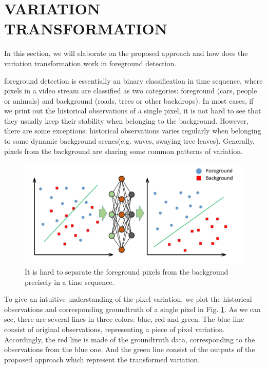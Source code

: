 \documentclass[journal]{IEEEtran}
\newcommand{\reffig}[1]{Fig. \ref{#1}}
\begin{document}
\section{VARIATION TRANSFORMATION}
\label{sec3}
In this section, we will elaborate on the proposed approach and how does the variation transformation work in foreground detection.

foreground detection is essentially an binary classification in time sequence, where pixels in a video stream are classified as two categories: foreground (cars, people or animals) and background (roads, trees or other backdrops). 
In most cases, if we print out the historical observations of a single pixel, it is not hard to see that they usually keep their stability when belonging to the background. 
However, there are some exceptions: historical observations varies regularly when belonging to some dynamic background scenes(e.g. 
waves, swaying tree leaves). 
Generally, pixels from the background are sharing some common patterns of variation. 
\begin{figure}[!t]	%
\centering
    \includegraphics[width=\linewidth]{figure/fig1}
    \caption{It is hard to separate the foreground pixels from the background precisely in a time sequence.}
    \label{variation_chart}
\end{figure}


To give an intuitive understanding of the pixel variation, we plot the historical observations and corresponding groundtruth of a single pixel in  \reffig{variation_chart}.
As we can see, there are several lines in three colors: blue, red and green. 
The blue line consist of original observations, representing a piece of pixel variation. 
Accordingly, the red line is made of the groundtruth data, corresponding to the observations from the blue one.  
And the green line consist of the outputs of the proposed approach which represent the transformed variation. 
\end{document}

